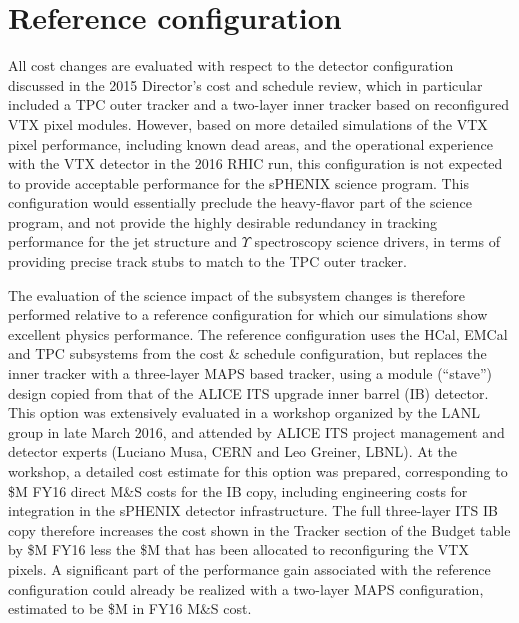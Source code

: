 \section{Reference configuration}

All cost changes are evaluated with respect to the detector
configuration discussed in the 2015 Director's cost and schedule
review, which in particular included a TPC outer tracker and a
two-layer inner tracker based on reconfigured VTX pixel
modules. However, based on more detailed simulations of the VTX pixel
performance, including known dead areas, and the operational
experience with the VTX detector in the 2016 RHIC run, this
configuration is not expected to provide acceptable performance for
the sPHENIX science program. This configuration would essentially
preclude the heavy-flavor part of the science program, and not provide
the highly desirable redundancy in tracking performance for the jet
structure and $\Upsilon$ spectroscopy science drivers, in terms of
providing precise track stubs to match to the TPC outer tracker.

The evaluation of the science impact of the subsystem changes is
therefore performed relative to a reference configuration for which
our simulations show excellent physics performance. The reference
configuration uses the HCal, EMCal and TPC subsystems from the cost \&
schedule configuration, but replaces the inner tracker with a
three-layer MAPS based tracker, using a module (``stave'') design
copied from that of the ALICE ITS upgrade inner barrel (IB)
detector. This option was extensively evaluated in a workshop
organized by the LANL group in late March 2016, and attended by ALICE
ITS project management and detector experts (Luciano Musa, CERN and
Leo Greiner, LBNL).  At the workshop, a detailed cost estimate for
this option was prepared, corresponding to \${\threeLayerMAPS}M FY16
direct M\&S costs for the IB copy, including engineering costs for
integration in the sPHENIX detector infrastructure.  The full
three-layer ITS IB copy therefore increases the cost shown in the
Tracker section of the Budget table by \${\threeLayerMAPS}M FY16 less
the \${\noVTX}M that has been allocated to reconfiguring the VTX
pixels. A significant part of the performance gain associated with the
reference configuration could already be realized with a two-layer
MAPS configuration, estimated to be \${\twoLayerMAPS}M in FY16 M\&S
cost.

